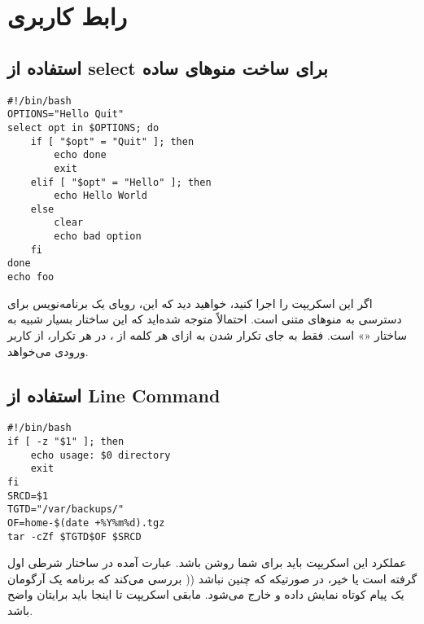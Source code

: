 \chapter{رابط کاربری}
\section*{استفاده از {\codefont select} برای ساخت منوهای ساده}
\begin{latin}
\begin{lstlisting}
#!/bin/bash
OPTIONS="Hello Quit"
select opt in $OPTIONS; do
	if [ "$opt" = "Quit" ]; then
		echo done
		exit
	elif [ "$opt" = "Hello" ]; then
		echo Hello World
	else
		clear
		echo bad option
	fi
done
echo foo
\end{lstlisting}
\end{latin}

اگر این اسکریپت را اجرا کنید، خواهید دید که این، رویای یک برنامه‌نویس برای دسترسی
به منو‌های متنی است. احتمالاً متوجه شده‌اید که این ساختار بسیار شبیه به ساختار «»
است‌. فقط به جای تکرار شدن به ازای هر کلمه‌ از ‌،‌ در هر تکرار، از کاربر
ورودی می‌خواهد.

\section*{استفاده از Line Command}
\begin{latin}
\begin{lstlisting}
#!/bin/bash
if [ -z "$1" ]; then
	echo usage: $0 directory
	exit
fi
SRCD=$1
TGTD="/var/backups/"
OF=home-$(date +%Y%m%d).tgz
tar -cZf $TGTD$OF $SRCD
\end{lstlisting}
\end{latin}

عملکرد این اسکریپت باید برای شما روشن باشد‌. عبارت آمده در ساختار شرطی اول بررسی
می‌کند که برنامه یک آرگومان )‎) گرفته است یا خیر، در صورتیکه که چنین نباشد یک
پیام کوتاه نمایش داده و خارج می‌شود. مابقی اسکریپت تا اینجا باید برایتان واضح باشد.
